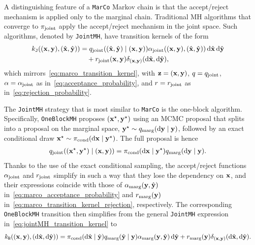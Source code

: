 \documentclass[onefignum,onetabnum]{siamonline250211}
\renewcommand{\d} {{\rm d}}                                %
\newcommand{\bfx}{{\bf x}}
\newcommand{\bfy}{{\bf y}}
\newcommand{\bfz}{{\bf z}}
\newcommand{\pjoint}{\pi_{\rm joint}}
\newcommand{\pcond}{\pi_{\rm cond}}
\newcommand{\MarCo}{\textnormal{\texttt{MarCo}}\xspace}
\newcommand{\Joint}{\textnormal{\texttt{JointMH}}\xspace}
\newcommand{\OneblockMCMC}{\textnormal{\texttt{OneBlockMH}}\xspace}
\begin{document}
%
%
%
%
%
%
A distinguishing feature of a \MarCo Markov chain is that the accept/reject mechanism is applied only to the marginal chain. 
Traditional MH algorithms that converge to $\pjoint$ apply the accept/reject mechanism in the joint space. 
Such algorithms, denoted by \Joint, have transition kernels of the form
\begin{align}
\label{eq:jointMH_transition_kernel}
    \begin{split}
    k_{\tt J}((\bfx, \bfy), (\hat{\bfx}, \hat{\bfy}))
    &= q_{\rm joint}((\hat{\bfx}, \hat{\bfy}) \mid (\bfx, \bfy))\alpha_{\rm joint}((\bfx, \bfy), (\hat{\bfx}, \hat{\bfy}))\, \d\hat\bfx\, \d\hat\bfy\\
    &\quad + r_{\rm joint}(\bfx, \bfy) \delta_{(\bfx, \bfy)}(\d\hat\bfx, \d\hat{\bfy}),
    \end{split}
\end{align}
which mirrors~\eqref{eq:marco_transition_kernel}, with $\bfz=(\bfx,\bfy)$, $q=q_{\rm joint}$, $\alpha=\alpha_{\rm joint}$ as in~\eqref{eq:acceptance_probability}, and $r=r_{\rm joint}$ as in~\eqref{eq:rejection_probability}.
%
%
%
%

The \Joint strategy that is most similar to \MarCo is the one-block algorithm. 
Specifically, \OneblockMCMC proposes $(\bfx^\star, \bfy^\star)$ using an MCMC proposal that splits into a proposal on the marginal space, $\bfy^\star \sim q_{\rm marg}(\d\bfy \mid \bfy)$, followed by an exact conditional draw $\bfx^\star \sim \pcond(\d\bfx \mid \bfy^\star)$. The full proposal is hence
\begin{align*}
    q_{\rm joint}((\bfx^\star, \bfy^\star) \mid (\bfx, \bfy)) = \pcond(\d\bfx \mid \bfy^\star)q_{\rm marg}(\d\bfy \mid \bfy).
\end{align*}
Thanks to the use of the exact conditional sampling, the accept/reject functions $\alpha_{\rm joint}$ and $r_{\rm joint}$ simplify in such a way that they lose the dependency on $\bfx$, and their expressions coincide with those of $\alpha_{\rm marg}(\bfy,\hat\bfy)$ in~\eqref{eq:marco_acceptance_probability} and $r_{\rm marg}(\bfy)$ in~\eqref{eq:marco_transition_kernel_rejection}, respectively.
The corresponding \OneblockMCMC transition then simplifies from the general \Joint expression in~\eqref{eq:jointMH_transition_kernel} to
%
%
%
%
%
%
%
%
\begin{equation}
\label{eq:oneblock_transition_kernel}
	k_{\tt B}((\bfx, \bfy), (\d\hat\bfx, \d\hat\bfy))
	=  \pcond(\d\hat\bfx \mid \hat\bfy) q_{\rm marg}(\hat{\bfy} \mid \bfy) \alpha_{\rm marg}(\bfy, \hat{\bfy}) \,\d\hat{\bfy}  + r_{\rm marg}(\bfy) \delta_{(\bfx,\bfy)}(\d\hat\bfx, \d \hat{\bfy}).
\end{equation}
%
\end{document}
